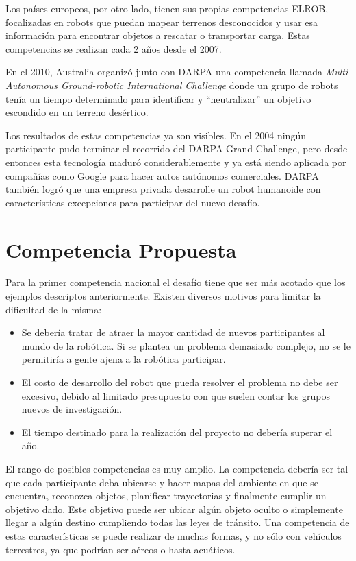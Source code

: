 \documentclass[a4paper,12pt]{article}
\begin{document}
Los países europeos, por otro lado, tienen sus propias competencias ELROB\cite{elrob}, focalizadas en robots que puedan mapear terrenos desconocidos y usar esa información para encontrar objetos a rescatar o transportar carga. Estas competencias se realizan cada 2 años desde el 2007.

En el 2010, Australia organizó junto con DARPA una competencia llamada \textit{Multi Autonomous Ground-robotic International Challenge}\cite{magic} donde un grupo de robots tenía un tiempo determinado para identificar y ``neutralizar'' un objetivo escondido en un terreno desértico.

Los resultados de estas competencias ya son visibles. En el 2004 ningún participante pudo terminar el recorrido del DARPA Grand Challenge, pero desde entonces esta tecnología maduró considerablemente y ya está siendo aplicada por compañías como Google para hacer autos autónomos comerciales\cite{googlesdc}. DARPA también logró que una empresa privada desarrolle un robot humanoide con características excepciones para participar del nuevo desafío.\cite{petman}

\section{Competencia Propuesta}

Para la primer competencia nacional el desafío tiene que ser más acotado que los ejemplos descriptos anteriormente. Existen diversos motivos para limitar la dificultad de la misma:
\begin{itemize}
 \item Se debería tratar de atraer la mayor cantidad de nuevos participantes al mundo de la robótica. Si se plantea un problema demasiado complejo, no se le permitiría a gente ajena a la robótica participar.
 \item El costo de desarrollo del robot que pueda resolver el problema no debe ser excesivo, debido al limitado presupuesto con que suelen contar los grupos nuevos de investigación.
 \item El tiempo destinado para la realización del proyecto no debería superar el año.
\end{itemize}

El rango de posibles competencias es muy amplio. La competencia debería ser tal que cada participante deba ubicarse y hacer mapas del ambiente en que se encuentra, reconozca objetos, planificar trayectorias y finalmente cumplir un objetivo dado. Este objetivo puede ser ubicar algún objeto oculto o simplemente llegar a algún destino cumpliendo todas las leyes de tránsito. Una competencia de estas características se puede realizar de muchas formas, y no sólo con vehículos terrestres, ya que podrían ser aéreos o hasta acuáticos\cite{auvsi}.
\end{document}
